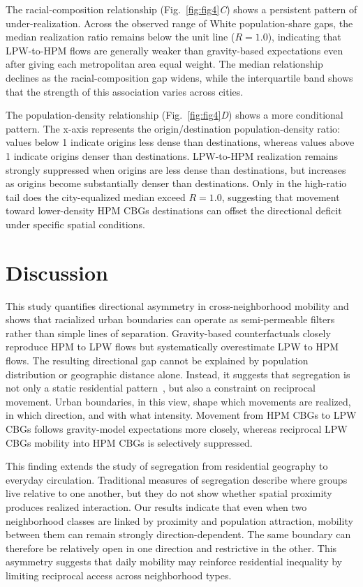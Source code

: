 \documentclass[9pt,twocolumn,twoside]{pnas-new}
\begin{document}
The racial-composition relationship (Fig.~\ref{fig:fig4}\textit{C}) shows a persistent pattern of under-realization. Across the observed range of White population-share gaps, the median realization ratio remains below the unit line ($R=1.0$), indicating that LPW-to-HPM flows are generally weaker than gravity-based expectations even after giving each metropolitan area equal weight. The median relationship declines as the racial-composition gap widens, while the interquartile band shows that the strength of this association varies across cities.

The population-density relationship (Fig.~\ref{fig:fig4}\textit{D}) shows a more conditional pattern. The x-axis represents the origin/destination population-density ratio: values below 1 indicate origins less dense than destinations, whereas values above 1 indicate origins denser than destinations. LPW-to-HPM realization remains strongly suppressed when origins are less dense than destinations, but increases as origins become substantially denser than destinations. Only in the high-ratio tail does the city-equalized median exceed $R=1.0$, suggesting that movement toward lower-density HPM CBGs destinations can offset the directional deficit under specific spatial conditions.

\section*{Discussion}

This study quantifies directional asymmetry in cross-neighborhood mobility and shows that racialized urban boundaries can operate as semi-permeable filters rather than simple lines of separation. Gravity-based counterfactuals closely reproduce HPM to LPW flows but systematically overestimate LPW to HPM flows. The resulting directional gap cannot be explained by population distribution or geographic distance alone. Instead, it suggests that segregation is not only a static residential pattern~\cite{massey1993american}, but also a constraint on reciprocal movement. Urban boundaries, in this view, shape which movements are realized, in which direction, and with what intensity. Movement from HPM CBGs to LPW CBGs follows gravity-model expectations more closely, whereas reciprocal LPW CBGs mobility into HPM CBGs is selectively suppressed.

This finding extends the study of segregation from residential geography to everyday circulation. Traditional measures of segregation describe where groups live relative to one another, but they do not show whether spatial proximity produces realized interaction. Our results indicate that even when two neighborhood classes are linked by proximity and population attraction, mobility between them can remain strongly direction-dependent. The same boundary can therefore be relatively open in one direction and restrictive in the other. This asymmetry suggests that daily mobility may reinforce residential inequality by limiting reciprocal access across neighborhood types.
\end{document}
